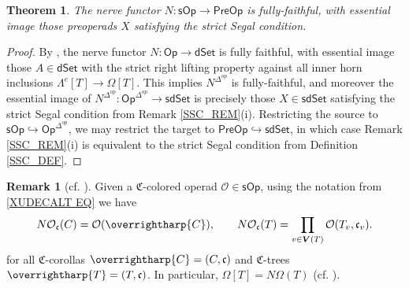 \documentclass[a4paper,10pt
,draft
]{article}%
\numberwithin{equation}{section}
\numberwithin{figure}{section}
\newtheorem{theorem}[equation]{Theorem}%
\theoremstyle{definition} %
\newtheorem{remark}[equation]{Remark}%
\newcommand{\vect}[1]{\text{\overrightharp{\ensuremath{#1}}}}
\newcommand{\Op}{\mathsf{Op}}%
\newcommand{\sOp}{\ensuremath{\mathsf{sOp}}}%
\newcommand{\dSet}{\mathsf{dSet}}
\newcommand{\sdSet}{\mathsf{sdSet}}
\newcommand{\PreOp}{\mathsf{PreOp}}
\renewcommand{\O}{\ensuremath{\mathcal O}}
\newcommand{\1}{\ensuremath{\mathbbm 1}}%
\begin{document}
\begin{theorem}
        \label{SSC_THM}
        The nerve functor $N \colon \sOp \to \PreOp$
        is fully-faithful, with essential image
        those preoperads $X$ satisfying the strict Segal condition.
\end{theorem}
\begin{proof}
        By \cite[Prop. 5.3 and Thm. 6.1]{MW09},
        the nerve functor
        $N \colon \Op \to \dSet$
        is fully faithful, with essential image
        those $A \in \dSet$ with the strict right lifting property against all inner horn inclusions $\Lambda^e[T] \to \Omega[T]$.
        This implies $N^{\Delta^{op}}$ is fully-faithful, and moreover
        the essential image of $N^{\Delta^{op}} \colon \Op^{\Delta^{op}} \to \sdSet$ is precisely
        those $X \in \sdSet$ satisfying the strict Segal condition from Remark \ref{SSC_REM}(i).
        Restricting the source to $\sOp \hookrightarrow \Op^{\Delta^{op}}$, we may restrict the target to $\PreOp \hookrightarrow \sdSet$,
        in which case Remark \ref{SSC_REM}(i) is equivalent to the strict Segal condition from Definition \ref{SSC_DEF}.
\end{proof}


\begin{remark}[{cf. \cite[Eq. (\ref{TAS-STRSEGCON EQ})]{BP_TAS}}]
        \label{NERVEEVAL_REM}
        Given a $\mathfrak C$-colored operad $\O \in \sOp$, using the notation from \eqref{XUDECALT EQ} we have
        \[
                N\O_{\mathfrak c}(C) = \O(\vect C),
                \qquad
                N \O_{\mathfrak c}(T) = \prod_{v \in \boldsymbol{V}(T)} \O(T_v, \mathfrak c_v).
        \]
        for all $\mathfrak C$-corollas $\vect C = (C, \mathfrak c)$ and
        $\mathfrak C$-trees $\vect T = (T, \mathfrak c)$.
        In particular, $\Omega[T] = N\Omega(T)$ (cf. \cite[Rem. \ref{TAS-NERVESIMDES REM}]{BP_TAS}).
\end{remark}


\end{document}
